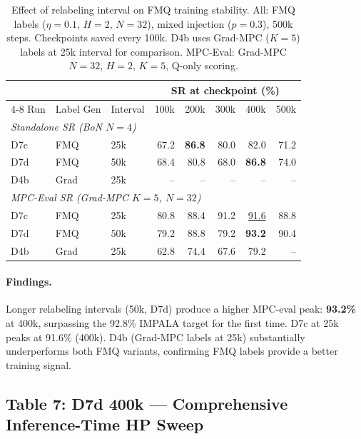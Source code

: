 \documentclass[11pt]{article}
\newcommand{\best}[1]{\textbf{#1}}
\newcommand{\ours}[1]{\underline{#1}}
\begin{document}
\begin{table}[h]
\centering
\caption{Effect of relabeling interval on FMQ training stability.
  All: FMQ labels ($\eta=0.1$, $H=2$, $N=32$), mixed injection ($p=0.3$), 500k steps.
  Checkpoints saved every 100k.
  D4b uses Grad-MPC ($K=5$) labels at 25k interval for comparison.
  MPC-Eval: Grad-MPC $N=32$, $H=2$, $K=5$, Q-only scoring.}
\begin{tabular}{lllrrrrr}
\toprule
& & & \multicolumn{5}{c}{SR at checkpoint (\%)} \\
\cmidrule(lr){4-8}
Run & Label Gen & Interval & 100k & 200k & 300k & 400k & 500k \\
\midrule
\multicolumn{8}{l}{\textit{Standalone SR (BoN $N=4$)}} \\
D7c & FMQ  & 25k   & 67.2 & \textbf{86.8} & 80.0 & 82.0 & 71.2 \\
D7d & FMQ  & 50k   & 68.4 & 80.8 & 68.0 & \textbf{86.8} & 74.0 \\
D4b & Grad & 25k   & --   &  --  &  --  &  --  & -- \\
\midrule
\multicolumn{8}{l}{\textit{MPC-Eval SR (Grad-MPC $K=5$, $N=32$)}} \\
D7c & FMQ  & 25k   & 80.8 & 88.4 & 91.2 & \ours{91.6} & 88.8 \\
D7d & FMQ  & 50k   & 79.2 & 88.8 & 79.2 & \best{93.2} & 90.4 \\
D4b & Grad & 25k   & 62.8 & 74.4 & 67.6 & 79.2 & -- \\
\bottomrule
\end{tabular}
\end{table}

\paragraph{Findings.}
Longer relabeling intervals (50k, D7d) produce a higher MPC-eval peak: \textbf{93.2\%} at 400k,
surpassing the 92.8\% IMPALA target for the first time.
D7c at 25k peaks at 91.6\% (400k).
D4b (Grad-MPC labels at 25k) substantially underperforms both FMQ variants,
confirming FMQ labels provide a better training signal.

\subsection*{Table 7: D7d 400k --- Comprehensive Inference-Time HP Sweep}
\end{document}

